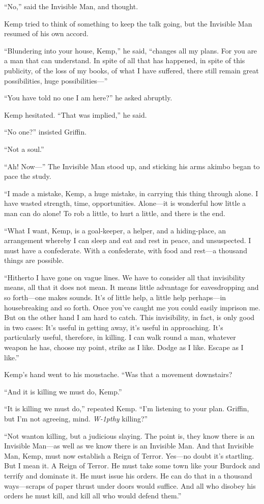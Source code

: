 “No,” said the Invisible Man, and thought.

Kemp tried to think of something to keep the talk going, but the Invisible Man resumed of his own accord.

“Blundering into your house, Kemp,” he said, “changes all my plans. For you are a man that can understand. In spite of all that has happened, in spite of this publicity, of the loss of my books, of what I have suffered, there still remain great possibilities, huge possibilities—”

“You have told no one I am here?” he asked abruptly.

Kemp hesitated. “That was implied,” he said.

“No one?” insisted Griffin.

“Not a soul.”

“Ah! Now—” The Invisible Man stood up, and sticking his arms akimbo began to pace the study.

“I made a mistake, Kemp, a huge mistake, in carrying this thing through alone. I have wasted strength, time, opportunities. Alone—it is wonderful how little a man can do alone! To rob a little, to hurt a little, and there is the end.

“What I want, Kemp, is a goal-keeper, a helper, and a hiding-place, an arrangement whereby I can sleep and eat and rest in peace, and unsuspected. I must have a confederate. With a confederate, with food and rest—a thousand things are possible.

“Hitherto I have gone on vague lines. We have to consider all that invisibility means, all that it does not mean. It means little advantage for eavesdropping and so forth—one makes sounds. It’s of little help, a little help perhaps—in housebreaking and so forth. Once you’ve caught me you could easily imprison me. But on the other hand I am hard to catch. This invisibility, in fact, is only good in two cases: It’s useful in getting away, it’s useful in approaching. It’s particularly useful, therefore, in killing. I can walk round a man, whatever weapon he has, choose my point, strike as I like. Dodge as I like. Escape as I like.”

Kemp’s hand went to his moustache. “Was that a movement downstairs?

“And it is killing we must do, Kemp.”

“It is killing we must do,” repeated Kemp. “I’m listening to your plan. Griffin, but I’m not agreeing, mind. \emph{W\kern-1pthy} killing?”

“Not wanton killing, but a judicious slaying. The point is, they know there is an Invisible Man—as well as we know there is an Invisible Man. And that Invisible Man, Kemp, must now establish a Reign of Terror. Yes—no doubt it’s startling. But I mean it. A Reign of Terror. He must take some town like your Burdock and terrify and dominate it. He must issue his orders. He can do that in a thousand ways—scraps of paper thrust under doors would suffice. And all who disobey his orders he must kill, and kill all who would defend them.”

